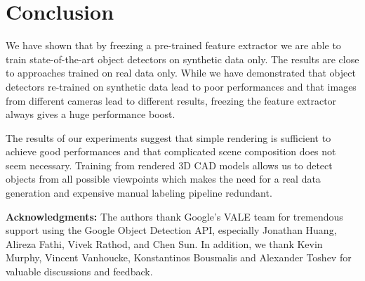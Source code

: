 \documentclass[10pt,twocolumn,letterpaper]{article}
\begin{document}
\section{Conclusion}
\label{sec:conclusions}

We have  shown that by  freezing a pre-trained feature  extractor we are  able to
train state-of-the-art object  detectors  on synthetic  data only.  The results
are close to  approaches trained on real data only.   While we have demonstrated
that  object  detectors   re-trained  on  synthetic  data   lead  to  poor
performances and that  images from different cameras lead  to different results,
freezing the feature extractor always gives a huge performance boost.

The results  of our experiments suggest  that simple rendering is  sufficient to
achieve good performances  and that complicated scene composition  does not seem
necessary.  Training  from rendered 3D  CAD models  allows us to  detect objects
from all possible viewpoints which makes the need for a real data generation and
expensive manual labeling pipeline redundant.

  
\textbf{Acknowledgments:} The authors thank Google's VALE team for tremendous support using the Google Object Detection API, especially Jonathan Huang, Alireza Fathi, Vivek Rathod, and Chen Sun. In addition, we thank Kevin Murphy, Vincent Vanhoucke, Konstantinos Bousmalis and Alexander Toshev for valuable discussions and feedback.


{
\small


}
\end{document}
